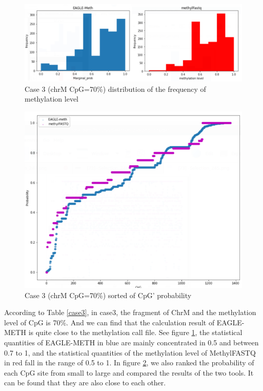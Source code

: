 \documentclass{PHlab-thesis}
\begin{document}
\begin{figure}[h!]
  \centering
  \includegraphics[scale=0.8]{figures/CHRM_70.PNG}
  \caption{Case 3 (chrM CpG=70\%) distribution of the frequency of methylation level}
  \label{fig:case_3_1} 
\end{figure}
\begin{figure}[h!]
  \centering
  \includegraphics[scale=0.8]{figures/CHRM_70_2.PNG}
  \caption{Case 3 (chrM CpG=70\%) sorted of CpG' probability}
  \label{fig:case_3_2} 
\end{figure}

\par According to Table \ref{case3}, in case3, the fragment of ChrM and the methylation level of CpG is 70\%. And we can find that the calculation result of EAGLE-METH is quite close to the methylation call file. See figure \ref{fig:case_3_1}, the statistical quantities of EAGLE-METH in blue are mainly concentrated in 0.5 and between 0.7 to 1, and the statistical quantities of the methylation level of MethylFASTQ in red fall in the range of 0.5 to 1. In figure \ref{fig:case_3_2}, we also ranked the probability of each CpG site from small to large and compared the results of the two tools.  It can be found that they are also close to each other.
\end{document}
